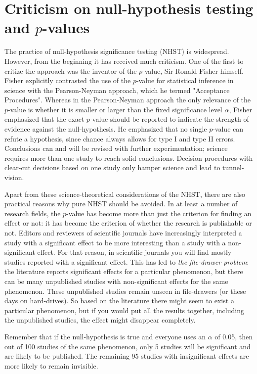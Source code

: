 \documentclass[]{book}\usepackage[]{graphicx}\usepackage[]{color}
\begin{document}
\section{Criticism on null-hypothesis testing and $p$-values}

The practice of null-hypothesis significance testing (NHST) is widespread. However, from the beginning it has received much criticism. One of the first to critize the approach was the inventor of the $p$-value, Sir Ronald Fisher himself. Fisher explicitly contrasted the use of the $p$-value for statistical inference in science with the Pearson-Neyman approach, which he termed "Acceptance Procedures". Whereas in the Pearson-Neyman approach the only relevance of the $p$-value is whether it is smaller or larger than the fixed significance level $\alpha$, Fisher emphasized that the exact $p$-value should be reported to indicate the strength of evidence against the null-hypothesis. He emphasized that no single $p$-value can refute a hypothesis, since chance always allows for type I and type II errors. Conclusions can and will be revised with further experimentation; science requires more than one study to reach solid conclusions. Decision procedures with clear-cut decisions based on one study only hamper science and lead to tunnel-vision.

Apart from these science-theoretical considerations of the NHST, there are also practical reasons why pure NHST should be avoided. In at least a number of research fields, the $p$-value has become more than just the criterion for finding an effect or not: it has become the criterion of whether the research is publishable or not. Editors and reviewers of scientific journals have increasingly interpreted a study with a significant effect to be more interesting than a study with a non-significant effect. For that reason, in scientific journals you will find mostly studies reported with a significant effect. This has led to \textit{the file-drawer problem}: the literature reports significant effects for a particular phenomenon, but there can be many unpublished studies with non-significant effects for the same phenomenon. These unpublished studies remain unseen in file-drawers (or these days on hard-drives). So based on the literature there might seem to exist a particular phenomenon, but if you would put all the results together, including the unpublished studies, the effect might disappear completely.

Remember that if the null-hypothesis is true and everyone uses an $\alpha$ of 0.05, then out of 100 studies of the same phenomenon, only 5 studies will be significant and are likely to be published. The remaining 95 studies with insignificant effects are more likely to remain invisible. 
\end{document}
